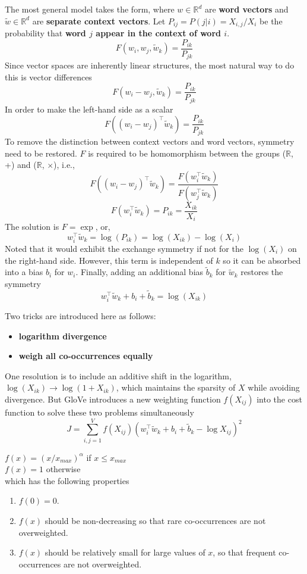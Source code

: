 \documentclass[a4paper, 12pt]{book} %
\begin{document}
The most general model takes the form, where $w \in \mathbb{R}^{d}$ are \textbf{word vectors} and $\tilde{w} \in \mathbb{R}^{d}$ are \textbf{separate context vectors}. Let $P_{ij}=P(j|i)=X_{i,j}/X_i$ be the probability that \textbf{word $j$ appear in the context of word $i$}.
$$F(w_i, w_j, \tilde{w}_k) = \frac{P_{ik}}{P_{jk}}$$
Since vector spaces are inherently linear structures, the most natural way to do this is vector differences
$$F(w_i-w_j, \tilde{w}_k) = \frac{P_{ik}}{P_{jk}}$$
In order to make the left-hand side as a scalar
$$F((w_i-w_j)^{\top}\tilde{w}_k) = \frac{P_{ik}}{P_{jk}}$$
To remove the distinction between context vectors and word vectors, symmetry need to be restored. $F$ is required to be homomorphism between the groups ($\mathbb{R}$, +) and ($\mathbb{R}$, $\times$), i.e.,
$$F((w_i-w_j)^{\top}\tilde{w}_k) = \frac{F(w_i^{\top}\tilde{w}_k)}{F(w_j^{\top}\tilde{w}_k)}$$
$$F(w_i^{\top}\tilde{w}_k) = P_{ik} = \frac{X_{ik}}{X_i}$$
The solution is $F=\exp$, or, 
$$ w_i^{\top}\tilde{w}_k = \log{(P_{ik})} = \log{(X_{ik})}-\log{(X_{i})}$$
Noted that it would exhibit the exchange symmetry if not for the $\log{(X_i)}$ on the right-hand side. However, this term is independent of $k$ so it can be absorbed into a bias $b_i$ for $w_i$. Finally, adding an additional bias $\tilde{b}_k$ for  $\tilde{w}_k$ restores the symmetry
$$ w_i^{\top}\tilde{w}_k +  b_i + \tilde{b}_k = \log{(X_{ik})}$$

Two tricks are introduced here as follows:
\begin{itemize}
	\item \textbf{logarithm divergence}
	\item \textbf{weigh all co-occurrences equally}
\end{itemize}
One resolution is to include an additive shift in the logarithm, $\log{(X_{ik})} \to \log{(1+X_{ik})}$, which maintains the sparsity of $X$ while avoiding divergence. But GloVe introduces a new weighting function $f(X_{ij})$ into the cost function to solve these two problems simultaneously
$$J=\sum_{i,j=1}^{V}{f(X_{ij})(w_i^{\top}\tilde{w}_k +  b_i + \tilde{b}_k - \log{X_{ij}})^2}$$

$f(x)=(x/x_{max})^\alpha$ if $x \le x_{max}$ \\
\indent $f(x)=1$ otherwise \\

which has the following properties
\begin{enumerate}
	\item $f(0)=0$.
	\item $f(x)$ should be non-decreasing so that rare co-occurrences are not overweighted.
	\item $f(x)$ should be relatively small for large values of $x$, so that frequent co-occurrences are
	not overweighted.
\end{enumerate}
\end{document}
